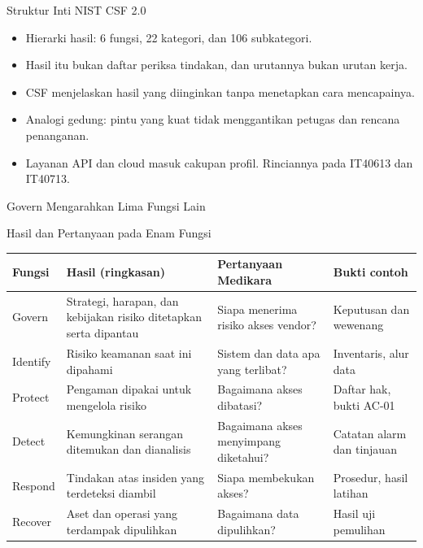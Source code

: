 \documentclass[aspectratio=169, table, 12pt]{beamer}
\begin{document}
\begin{frame}{{\Large Struktur Inti NIST CSF 2.0}}
  \vspace{6pt}
  \small
  \begin{itemize}
    \item Hierarki hasil: 6 fungsi, 22 kategori, dan 106 subkategori.
    \item Hasil itu bukan daftar periksa tindakan, dan urutannya bukan urutan kerja.
    \item CSF menjelaskan hasil yang diinginkan tanpa menetapkan cara mencapainya.
    \item Analogi gedung: pintu yang kuat tidak menggantikan petugas dan rencana penanganan.
    \item Layanan API dan cloud masuk cakupan profil. Rinciannya pada IT40613 dan IT40713.
  \end{itemize}
\end{frame}

\begin{frame}{{\Large Govern Mengarahkan Lima Fungsi Lain}}
  \begin{center}
    \resizebox{!}{5.6cm}{}
  \end{center}
\end{frame}

\begin{frame}{{\Large Hasil dan Pertanyaan pada Enam Fungsi}}
  \vspace{2pt}
  \scriptsize
  \begin{tabularx}{\textwidth}{|>{\raggedright\arraybackslash}p{}|>{\raggedright\arraybackslash}X|>{\raggedright\arraybackslash}X|>{\raggedright\arraybackslash}p{}|}
    \hline
    \textbf{Fungsi} & \textbf{Hasil (ringkasan)} & \textbf{Pertanyaan Medikara} & \textbf{Bukti contoh}
    \\ \hline
    Govern & Strategi, harapan, dan kebijakan risiko ditetapkan serta dipantau & Siapa menerima
    risiko akses vendor? & Keputusan dan wewenang \\ \hline
    Identify & Risiko keamanan saat ini dipahami & Sistem dan data apa yang terlibat? & Inventaris,
    alur data \\ \hline
    Protect & Pengaman dipakai untuk mengelola risiko & Bagaimana akses dibatasi? & Daftar hak, bukti
    AC-01 \\ \hline
    Detect & Kemungkinan serangan ditemukan dan dianalisis & Bagaimana akses menyimpang diketahui? &
    Catatan alarm dan tinjauan \\ \hline
    Respond & Tindakan atas insiden yang terdeteksi diambil & Siapa membekukan akses? & Prosedur,
    hasil latihan \\ \hline
    Recover & Aset dan operasi yang terdampak dipulihkan & Bagaimana data dipulihkan? & Hasil uji
    pemulihan \\ \hline
  \end{tabularx}
\end{frame}
\end{document}
